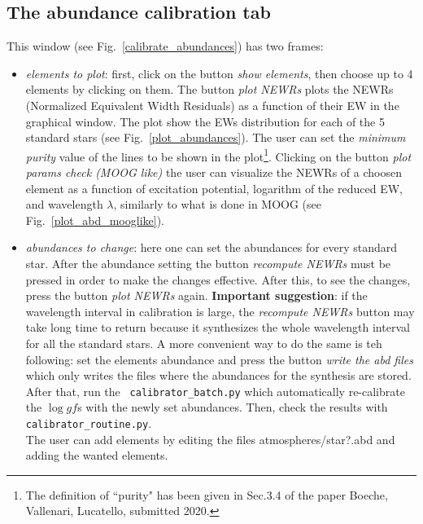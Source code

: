 \documentclass[a4paper,10pt]{article}
\newcommand\loggf{$\log gf$}
\begin{document}

\subsection{The abundance calibration tab}\label{sec_abd_tab}

This window (see Fig.~\ref{calibrate_abundances}) has two frames:\\
\begin{itemize}
%
\item {\em elements to plot}: first, click on the button {\em show
elements},
then choose up to 4 elements by clicking on them. The button
{\em plot NEWRs} plots the NEWRs (Normalized Equivalent Width Residuals)
as a function of their EW in the graphical
window. The plot show the EWs distribution for each of the 5 standard stars
(see Fig.~\ref{plot_abundances}).
The user can set the {\em minimum purity} value 
of the lines to be shown in the plot\footnote{The definition 
of ``purity" has been given in Sec.3.4
of the paper Boeche, Vallenari, Lucatello, submitted 2020.}.
Clicking on the button {\em plot params check (MOOG like)} the user can
visualize the NEWRs of a choosen element as a function of excitation
potential, logarithm of the reduced EW, and wavelength $\lambda$, similarly
to what is done in MOOG (see Fig.~\ref{plot_abd_mooglike}).
%
\item{\em abundances to change}: here one can set the abundances for every
standard star. After the abundance setting the button {\em recompute NEWRs} must be
pressed in order to make the changes effective. After this, to see the
changes, press the button {\em plot NEWRs} again. {\bf Important suggestion}: if the
wavelength interval in calibration is large, the {\em recompute NEWRs}
button may take long time to return because
it synthesizes the whole wavelength interval for all the standard stars. A
more convenient way to do the same is teh following: set the elements abundance and press the button
{\em write the abd files} which only writes the files where the abundances
for the synthesis are stored. After that, run the {\tt
calibrator\_batch.py} which automatically re-calibrate the \loggf s with the
newly set abundances. Then, check the results with {\tt
calibrator\_routine.py}.\\

The user can add elements by editing the files atmospheres/star?.abd and
adding the wanted elements.
%
\end{itemize}
\end{document}
